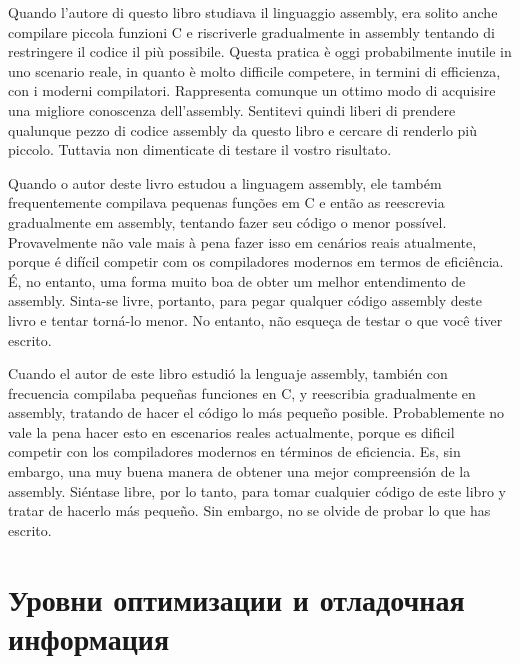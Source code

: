 \ifdefined\ITALIAN
Quando l'autore di questo libro studiava il linguaggio assembly, era solito anche compilare piccola funzioni C e riscriverle gradualmente in assembly tentando di restringere il codice il più possibile.
Questa pratica è oggi probabilmente inutile in uno scenario reale, in quanto è molto difficile competere, in termini di efficienza, con i moderni compilatori. Rappresenta comunque un ottimo modo di acquisire una migliore conoscenza dell'assembly.
Sentitevi quindi liberi di prendere qualunque pezzo di codice assembly da questo libro e cercare di renderlo più piccolo. Tuttavia non dimenticate di testare il vostro risultato.
\fi %

\ifdefined\BRAZILIAN
Quando o autor deste livro estudou a linguagem assembly, ele também frequentemente compilava pequenas funções em C e então as reescrevia gradualmente em assembly, tentando fazer seu código o menor possível.
Provavelmente não vale mais à pena fazer isso em cenários reais atualmente, 
porque é difícil competir com os compiladores modernos em termos de eficiência. É, no entanto, uma forma muito boa de obter um melhor entendimento de assembly.
Sinta-se livre, portanto, para pegar qualquer código assembly deste livro e tentar torná-lo menor.
No entanto, não esqueça de testar o que você tiver escrito.
\fi %

\ifdefined\SPANISH
Cuando el autor de este libro estudió la lenguaje assembly, también con frecuencia compilaba pequeñas funciones en C, y reescribia gradualmente en assembly, tratando de hacer el código lo más pequeño posible.
Probablemente no vale la pena hacer esto en escenarios reales actualmente, 
porque es dificil competir con los compiladores modernos en términos de eficiencia. Es, sin embargo, una muy buena manera de obtener una mejor compreensión de la assembly.
Siéntase libre, por lo tanto, para tomar cualquier código de este libro y tratar de hacerlo más pequeño.
Sin embargo, no se olvide de probar lo que has escrito.
\fi %

\fi %

\ifdefined\RUSSIAN
\section*{Уровни оптимизации и отладочная информация}


